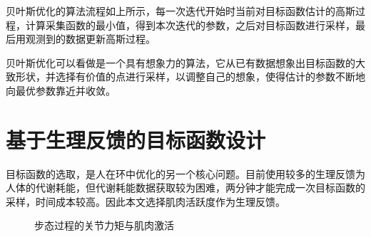 贝叶斯优化的算法流程如上所示，每一次迭代开始时当前对目标函数估计的高斯过程，计算采集函数的最小值，得到本次迭代的参数，之后对目标函数进行采样，最后用观测到的数据更新高斯过程。

贝叶斯优化可以看做是一个具有想象力的算法，它从已有数据想象出目标函数的大致形状，并选择有价值的点进行采样，以调整自己的想象，使得估计的参数不断地向最优参数靠近并收敛。

\section{基于生理反馈的目标函数设计}

目标函数的选取，是人在环中优化的另一个核心问题。目前使用较多的生理反馈为人体的代谢耗能，但代谢耗能数据获取较为困难，两分钟才能完成一次目标函数的采样，时间成本较高。因此本文选择肌肉活跃度作为生理反馈。
\begin{figure}[htb]
    \caption{步态过程的关节力矩与肌肉激活\cite{p44}}
    \label{fig:subfigss}
\end{figure}

